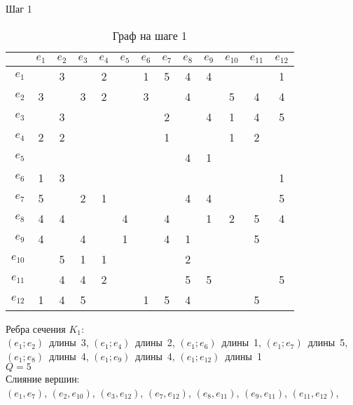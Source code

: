 \documentclass[a4paper,12pt]{article}
\begin{document}
\bigskip
\noindent
\begin{minipage}{\textwidth}
Шаг 1\\
\begin{table}[H]
\centering
\caption{Граф на шаге 1}
\begin{tabular}{r*{12}{|c}}
&$e_{1}$&$e_{2}$&$e_{3}$&$e_{4}$&$e_{5}$&$e_{6}$&$e_{7}$&$e_{8}$&$e_{9}$&$e_{10}$&$e_{11}$&$e_{12}$\\
\hline $e_{1}$&&3&&2&&1&5&4&4&&&1\\
\hline $e_{2}$&3&&3&2&&3&&4&&5&4&4\\
\hline $e_{3}$&&3&&&&&2&&4&1&4&5\\
\hline $e_{4}$&2&2&&&&&1&&&1&2&\\
\hline $e_{5}$&&&&&&&&4&1&&&\\
\hline $e_{6}$&1&3&&&&&&&&&&1\\
\hline $e_{7}$&5&&2&1&&&&4&4&&&5\\
\hline $e_{8}$&4&4&&&4&&4&&1&2&5&4\\
\hline $e_{9}$&4&&4&&1&&4&1&&&5&\\
\hline $e_{10}$&&5&1&1&&&&2&&&&\\
\hline $e_{11}$&&4&4&2&&&&5&5&&&5\\
\hline $e_{12}$&1&4&5&&&1&5&4&&&5&\\
\end{tabular}
\end{table}
Ребра сечения $K_{1}$:\\
\mbox{$(e_{1};e_{2})$ длины 3},
\mbox{$(e_{1};e_{4})$ длины 2},
\mbox{$(e_{1};e_{6})$ длины 1},
\mbox{$(e_{1};e_{7})$ длины 5},
\mbox{$(e_{1};e_{8})$ длины 4},
\mbox{$(e_{1};e_{9})$ длины 4},
\mbox{$(e_{1};e_{12})$ длины 1}\\
$Q=5$\\
Слияние вершин:\\
\mbox{$(e_{1},e_{7})$},
\mbox{$(e_{2},e_{10})$},
\mbox{$(e_{3},e_{12})$},
\mbox{$(e_{7},e_{12})$},
\mbox{$(e_{8},e_{11})$},
\mbox{$(e_{9},e_{11})$},
\mbox{$(e_{11},e_{12})$},
\end{minipage}
\bigskip
\noindent
\end{document}
